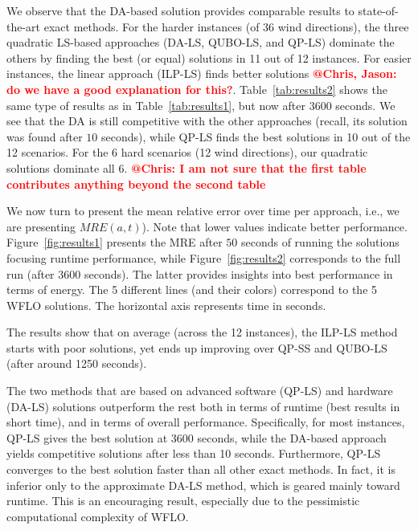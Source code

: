 \documentclass[preprint,12pt]{elsarticle}
\newcommand{\todo}[1]{{\textcolor{red}{\bf {#1}}}}
\begin{document}
We observe that the DA-based solution provides
comparable results to state-of-the-art exact methods. For the harder instances (of $36$ wind directions),
the three quadratic LS-based approaches (DA-LS, QUBO-LS, and QP-LS) dominate the others by finding the best (or equal) solutions in 11 out of 12 instances. For easier instances, 
the linear approach (ILP-LS) finds better solutions \todo{@Chris, Jason: do we have a good explanation for this?}. Table~\ref{tab:results2} shows the same type of results as in Table~\ref{tab:results1}, but now after $3600$ seconds. We see that the DA is still competitive with the other approaches (recall, its solution was found after $10$ seconds),
while QP-LS finds the best solutions in 10 out of the 12 scenarios. For the 6 hard scenarios (12 wind directions), our quadratic solutions
dominate all 6. \todo{@Chris: I am not sure that the first table contributes anything beyond the second table}

We now turn to present the mean relative error over time per approach, i.e., we are presenting $MRE(a,t)$). Note that lower values indicate better performance.  Figure~\ref{fig:results1} 
presents the MRE after $50$ seconds of running the solutions focusing runtime performance, while Figure~\ref{fig:results2} corresponds
to the full run (after $3600$ seconds). The latter provides insights into best performance in terms of energy. The 5 different lines (and their colors) 
correspond to the 5 WFLO solutions. The horizontal axis represents time in seconds.


The results show that on average (across the 12 instances),
the ILP-LS method starts with poor solutions, yet ends up improving over QP-SS and QUBO-LS (after around 1250 seconds).

The two methods that are based on advanced software (QP-LS) and hardware (DA-LS) solutions
outperform the rest both in terms of runtime (best results in short time), and in terms of overall performance.
Specifically, for most instances, QP-LS gives the best solution at 3600 seconds, while the DA-based approach
yields competitive solutions after less than 10 seconds. Furthermore, QP-LS converges to the best solution faster than all other exact methods. In fact, it is inferior only to the approximate DA-LS method, which is geared mainly toward runtime. This is an encouraging result, especially due to the pessimistic computational complexity of WFLO.
\end{document}
